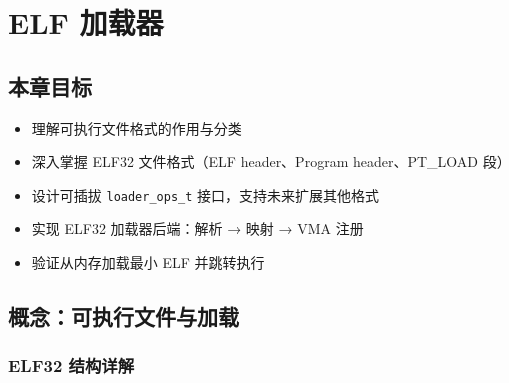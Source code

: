 \chapter{ELF 加载器}
\label{ch:elf-loader}

\section{本章目标}

\begin{itemize}
  \item 理解可执行文件格式的作用与分类
  \item 深入掌握 ELF32 文件格式（ELF header、Program header、PT\_LOAD 段）
  \item 设计可插拔 \texttt{loader\_ops\_t} 接口，支持未来扩展其他格式
  \item 实现 ELF32 加载器后端：解析 → 映射 → VMA 注册
  \item 验证从内存加载最小 ELF 并跳转执行
\end{itemize}

\section{概念：可执行文件与加载}
\label{sec:elf-concept}


\subsection{ELF32 结构详解}

%

